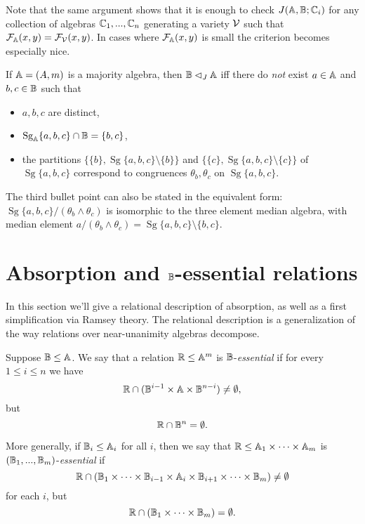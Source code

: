 \documentclass[letterpaper,11pt]{article}
\DeclareMathOperator{\Clo}{Clo}
\DeclareMathOperator{\Sg}{Sg}
\begin{document}
Note that the same argument shows that it is enough to check $J(\mathbb{A},\mathbb{B};\mathbb{C}_i)$ for any collection of algebras $\mathbb{C}_1, ..., \mathbb{C}_n$ generating a variety $\mathcal{V}$ such that $\mathcal{F}_{\mathbb{A}}(x,y) = \mathcal{F}_{\mathcal{V}}(x,y)$. In cases where $\mathcal{F}_{\mathbb{A}}(x,y)$ is small the criterion becomes especially nice.


\begin{cor} If $\mathbb{A} = (A,m)$ is a majority algebra, then $\mathbb{B} \lhd_J \mathbb{A}$ iff there do \emph{not} exist $a\in \mathbb{A}$ and $b,c \in \mathbb{B}$ such that
\begin{itemize}
\item $a,b,c$ are distinct,
\item $\Sg_\bA\{a,b,c\} \cap \bB = \{b,c\}$,
\item the partitions $\{\{b\},\Sg\{a,b,c\}\setminus \{b\}\}$ and $\{\{c\},\Sg\{a,b,c\}\setminus \{c\}\}$ of $\Sg\{a,b,c\}$ correspond to congruences $\theta_b, \theta_c$ on $\Sg\{a,b,c\}$.
\end{itemize}
The third bullet point can also be stated in the equivalent form: $\Sg\{a,b,c\}/(\theta_b\wedge\theta_c)$ is isomorphic to the three element median algebra, with median element $a/(\theta_b \wedge \theta_c) = \Sg\{a,b,c\}\setminus\{b,c\}$.
\end{cor}



\section{Absorption and $\mathbb{B}$-essential relations}

In this section we'll give a relational description of absorption, as well as a first simplification via Ramsey theory. The relational description is a generalization of the way relations over near-unanimity algebras decompose.

\begin{defn} Suppose $\mathbb{B} \le \mathbb{A}$. We say that a relation $\mathbb{R} \le \mathbb{A}^m$ is $\mathbb{B}$-\emph{essential} if for every $1 \le i \le n$ we have
\[
\mathbb{R} \cap (\mathbb{B}^{i-1} \times \mathbb{A} \times \mathbb{B}^{n-i}) \ne \emptyset,
\]
but
\[
\mathbb{R} \cap \mathbb{B}^n = \emptyset.
\]

More generally, if $\mathbb{B}_i \le \mathbb{A}_i$ for all $i$, then we say that $\mathbb{R} \le \mathbb{A}_1 \times \cdots \times \mathbb{A}_m$ is $(\mathbb{B}_1, ..., \mathbb{B}_m)$-\emph{essential} if
\[
\mathbb{R} \cap (\mathbb{B}_1 \times \cdots \times \mathbb{B}_{i-1} \times \mathbb{A}_i \times \mathbb{B}_{i+1} \times \cdots \times \mathbb{B}_m) \ne \emptyset
\]
for each $i$, but
\[
\mathbb{R} \cap (\mathbb{B}_1 \times \cdots \times \mathbb{B}_m) = \emptyset.
\]
\end{defn}
\end{document}
